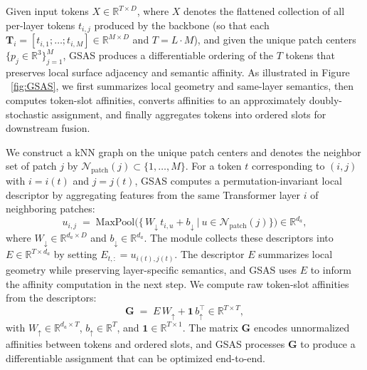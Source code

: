 Given input tokens \(X\in\mathbb{R}^{T\times D}\), where \(X\) denotes the flattened collection of all per-layer tokens \(t_{i,j}\) produced by the backbone (so that each \(\mathbf{T}_i=[t_{i,1};\dots;t_{i,M}]\in\mathbb{R}^{M\times D}\) and \(T=L\cdot M\)), and given the unique patch centers \(\{p_j\in\mathbb{R}^3\}_{j=1}^M\), GSAS produces a differentiable ordering of the \(T\) tokens that preserves local surface adjacency and semantic affinity. As illustrated in Figure ~\ref{fig:GSAS}, we first summarizes local geometry and same-layer semantics, then computes token-slot affinities, converts affinities to an approximately doubly-stochastic assignment, and finally aggregates tokens into ordered slots for downstream fusion.

We construct a kNN graph on the unique patch centers and denotes the neighbor set of patch \(j\) by \(\mathcal{N}_{\mathrm{patch}}(j)\subset\{1,\dots,M\}\). For a token \(t\) corresponding to \((i,j)\) with \(i=i(t)\) and \(j=j(t)\), GSAS computes a permutation-invariant local descriptor by aggregating features from the same Transformer layer \(i\) of neighboring patches:
\begin{equation}
u_{i,j} \;=\; \mathrm{MaxPool}\Big(\big\{\,W_{\downarrow}\,t_{i,u} + b_{\downarrow} \ \big|\ u\in\mathcal{N}_{\mathrm{patch}}(j)\big\}\Big)\in\mathbb{R}^{d_a},
\end{equation}
where \(W_{\downarrow}\in\mathbb{R}^{d_a\times D}\) and \(b_{\downarrow}\in\mathbb{R}^{d_a}\). The module collects these descriptors into \(E\in\mathbb{R}^{T\times d_a}\) by setting \(E_{t,:}=u_{i(t),j(t)}\). The descriptor \(E\) summarizes local geometry while preserving layer-specific semantics, and GSAS uses \(E\) to inform the affinity computation in the next step. We compute raw token-slot affinities from the descriptors:
\begin{equation}
\mathbf{G} \;=\; E\,W_{\uparrow} + \mathbf{1}\,b_{\uparrow}^\top \in\mathbb{R}^{T\times T},
\end{equation}
with \(W_{\uparrow}\in\mathbb{R}^{d_a\times T}\), \(b_{\uparrow}\in\mathbb{R}^T\), and \(\mathbf{1}\in\mathbb{R}^{T\times 1}\). The matrix \(\mathbf{G}\) encodes unnormalized affinities between tokens and ordered slots, and GSAS processes \(\mathbf{G}\) to produce a differentiable assignment that can be optimized end-to-end.

